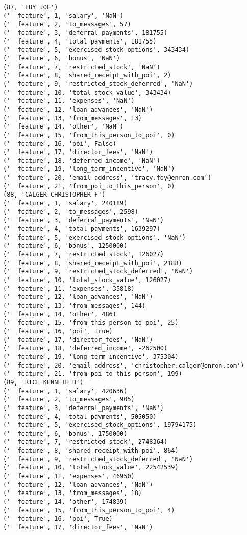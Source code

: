 \begin{verbatim}
(87, 'FOY JOE')
('  feature', 1, 'salary', 'NaN')
('  feature', 2, 'to_messages', 57)
('  feature', 3, 'deferral_payments', 181755)
('  feature', 4, 'total_payments', 181755)
('  feature', 5, 'exercised_stock_options', 343434)
('  feature', 6, 'bonus', 'NaN')
('  feature', 7, 'restricted_stock', 'NaN')
('  feature', 8, 'shared_receipt_with_poi', 2)
('  feature', 9, 'restricted_stock_deferred', 'NaN')
('  feature', 10, 'total_stock_value', 343434)
('  feature', 11, 'expenses', 'NaN')
('  feature', 12, 'loan_advances', 'NaN')
('  feature', 13, 'from_messages', 13)
('  feature', 14, 'other', 'NaN')
('  feature', 15, 'from_this_person_to_poi', 0)
('  feature', 16, 'poi', False)
('  feature', 17, 'director_fees', 'NaN')
('  feature', 18, 'deferred_income', 'NaN')
('  feature', 19, 'long_term_incentive', 'NaN')
('  feature', 20, 'email_address', 'tracy.foy@enron.com')
('  feature', 21, 'from_poi_to_this_person', 0)
(88, 'CALGER CHRISTOPHER F')
('  feature', 1, 'salary', 240189)
('  feature', 2, 'to_messages', 2598)
('  feature', 3, 'deferral_payments', 'NaN')
('  feature', 4, 'total_payments', 1639297)
('  feature', 5, 'exercised_stock_options', 'NaN')
('  feature', 6, 'bonus', 1250000)
('  feature', 7, 'restricted_stock', 126027)
('  feature', 8, 'shared_receipt_with_poi', 2188)
('  feature', 9, 'restricted_stock_deferred', 'NaN')
('  feature', 10, 'total_stock_value', 126027)
('  feature', 11, 'expenses', 35818)
('  feature', 12, 'loan_advances', 'NaN')
('  feature', 13, 'from_messages', 144)
('  feature', 14, 'other', 486)
('  feature', 15, 'from_this_person_to_poi', 25)
('  feature', 16, 'poi', True)
('  feature', 17, 'director_fees', 'NaN')
('  feature', 18, 'deferred_income', -262500)
('  feature', 19, 'long_term_incentive', 375304)
('  feature', 20, 'email_address', 'christopher.calger@enron.com')
('  feature', 21, 'from_poi_to_this_person', 199)
(89, 'RICE KENNETH D')
('  feature', 1, 'salary', 420636)
('  feature', 2, 'to_messages', 905)
('  feature', 3, 'deferral_payments', 'NaN')
('  feature', 4, 'total_payments', 505050)
('  feature', 5, 'exercised_stock_options', 19794175)
('  feature', 6, 'bonus', 1750000)
('  feature', 7, 'restricted_stock', 2748364)
('  feature', 8, 'shared_receipt_with_poi', 864)
('  feature', 9, 'restricted_stock_deferred', 'NaN')
('  feature', 10, 'total_stock_value', 22542539)
('  feature', 11, 'expenses', 46950)
('  feature', 12, 'loan_advances', 'NaN')
('  feature', 13, 'from_messages', 18)
('  feature', 14, 'other', 174839)
('  feature', 15, 'from_this_person_to_poi', 4)
('  feature', 16, 'poi', True)
('  feature', 17, 'director_fees', 'NaN')

\end{verbatim}
